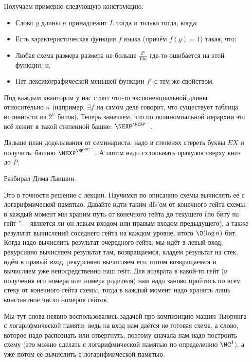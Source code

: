 	Получаем примерно следующую конструкцию:
	\begin{itemize}
		\item Слово $y$ длины $n$ принадлежит $L$ тогда и только тогда, когда:
		\item Есть характеристическая функция $f$ языка (причём $f(y)=1$) такая, что:
		\item Любая схема размера размера не больше $\frac{2^n}{10n}$ где-то ошибается на этой функции, и,
		\item Нет лексикографической меньшей функции $f'$ с тем же свойством.
	\end{itemize}
	Под каждым квантором у нас стоит что-то экспоненциальной длины относительно $n$ 
	(например, $\exists f$ на самом деле говорит, что существует таблица истинности из $2^n$ битов).
	Теперь замечаем, что по полиномиальной иерархии это всё лежит в такой степенной башне:
	$\NEXP^{\NEXP^{\dots}}$.
	
	Дальше план доделывания от семинариста: надо в степенях стереть буквы $EX$ и получить,
	башню $\NEXP^{\NP^{\NP^{\dots}}}$.
	А потом надо схлопывать оракулов сверху вниз до $P$.

	Разбирал Дима Лапшин.

	Это в точности решение с лекции.
	Научимся по описанию схемы вычислять её с логарифмической памятью.
	Давайте идти таким dfs'ом от конечного гейта схемы: в каждый момент
	мы храним путь от конечного гейта до текущего (по биту на гейт "---
	является ли он левым входом или правым входом предыдущего),
	а также результат вычислений соседнего гейта на каждом уровне, итого
	$\O(\log n)$ бит.
	Когда надо вычислить результат очередного гейта, мы идёт в левый вход,
	рекурсивно вычисляем результат там, возвращаемся, кладём результат на стек,
	идём в правый вход,	рекурсивно вычисляем его, потом возвращаемся и вычисляем
	уже непосредственно наш гейт.
	Для возврата в какой-то гейт (и получения его номера или номера родителя) нам
	надо заново пройтись по всем стеку от конечного гейта схемы, тогда в каждый
	момент надо хранить лишь константное число номеров гейтов.

	\begin{Rem}
		Мы тут снова неявно воспользовались задачей про компизицию машин Тьюринга
		с логарифмической памяти: ведь на вход нам даётся не готовая схема,
		а слово, которое надо распознать или отвергнуть, поэтому сначала нам надо
		построить схему (это можно сделать с логарифмической памятью по определению
		$\NC^1$), а уже потом её вычислить с логарифмической памятью.
	\end{Rem}

